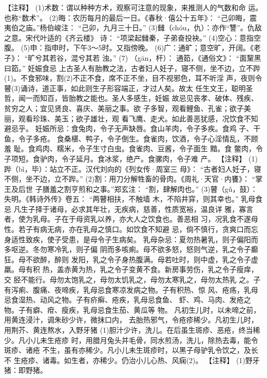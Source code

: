 \documentclass[12pt,UTF8]{ctexbook}
\begin{document}
【注释】
(1)术数：谓以种种方术，观察可注意的现象，来推测人的气数和命
运。也称“数术”。
(2)晦：农历每月的最后一日。《春秋·僖公十五年》：
“己卯晦，震
夷伯之庙。”杨伯峻注：
“己卯，九月三十日。”
(3)雠（chóu，仇）：亦作“讐”。仇敌之意。宋代叶适的《齐云楼》
诗：
“项梁起雠秦，子弟奋投袂。”
(4)空心：意指空腹。
(5)申：指申时，下午3～5时。又指傍晚。
(6)广：通旷；意空旷，开阔。《老子》：
“旷兮其若谷，混兮其若
浊。”
(7) （gān，杆）： 通筎，《通俗文》：
“面黧黑曰筎。”
妊娠食忌
上古圣人有胎教之法，古者妇人妊子，寝不侧，坐不边，立不跸
(1)。不食邪味，割(2)不正不食，席不正不坐，目不视邪色，耳不听淫
声，夜则令瞽(3)诵诗，道正事，如此则生子形容端正，才过人矣。故太
任生文王，聪明圣哲，闻一而知百，皆胎教之能也。圣人多感生，妊娠
故忌见丧孝、破体、残疾、贫穷之人；宜见贤良、喜庆、美丽之事。欲
子多智，观看鲤鱼、孔雀；欲子美丽，观看珍珠、美玉；欲子雄壮，观
看飞鹰、走犬。如此善恶犹感，况饮食不知避忌乎。
妊娠所忌：食兔肉，令子无声缺唇。食山羊肉，令子多疾。食鸡
子、干鱼，令子多疮。
食桑椹、鸭子，令子倒生。食雀肉，饮酒，令子心淫情乱，不顾羞
耻。食鸡肉、糯米，令子生寸白虫。食雀肉、豆酱，令子面生 黯。食
鳖肉，令子项短。食驴肉，令子延月。食冰浆，绝产。食骡肉，令子难
产。
【注释】
(1)跸（bì，毕）：站立不正。汉代刘向的《列女传·周室三
母》：
“古者妇人妊子，寝不侧，坐不边，立不跸。”
(2)割：用刀分解牲畜的骨肉。《周礼·天官·内饔》：
“掌王及后世
子膳羞之割亨煎和之事。”郑玄注：
“割，肆解肉也。”
(3)瞽（gǔ，鼓）：失明。《韩诗外传》卷五：
“两瞽相扶，不触墙
木，不陷井穽，则其幸也。”
乳母食忌
凡生子择于诸母，必求其年壮，无疾病，慈善，性质宽裕，温良详
雅，寡言者，使为乳母。子在于母资乳以养，亦大人之饮食也。善恶相
习，况乳食不遂母性。若子有病无病，亦在乳母之慎口。如饮食不知避
忌，倘不慎行，贪爽口而忘身适性致疾，使子受患，是母令子生病矣。
乳母杂忌：夏勿热暑乳，则子偏阳而多呕逆。冬勿寒冷乳，则子偏
阴而多咳痢。母不欲多怒，怒则气逆，乳之令子癫狂。母不欲醉，醉则
发阳，乳之令子身热腹满。母若吐时，则中虚，乳之令子虚羸。母有积
热，盖赤黄为热，乳之令子变黄不食。新房事劳伤，乳之令子瘦痒，交
胫不能行。母勿太饱乳之，母勿太饥乳之，母勿太寒乳之，母勿太热乳
之。子有泻痢、腹痛、夜啼疾，乳母忌食寒凉发病之物。子有积热、惊
风、疮疡，乳母忌食湿热、动风之物。子有疥癣、疮疾，乳母忌食鱼、
虾、鸡、马肉、发疮之物。子有癖、疳、瘦疾，乳母忌食生茄、黄瓜等
物。
凡初生儿时，以未啼之前，用黄连浸汁，调朱砂少许，微抹口内，
去胎热邪气，令疮疹稀少。凡初生儿时，用荆芥、黄连熬水，入野牙猪
(1)胆汁少许，洗儿。在后虽生斑疹、恶疮，终当稀少。凡小儿未生疮疹
时，用腊月兔头并毛骨，同水煎汤，洗儿，除热去毒，能令斑疹、诸疮
不生，虽有亦稀少。凡小儿未生斑疹时，以黑子母驴乳令饮之，及长不
生疮疹、诸毒。如生者，亦稀少。仍治小儿心热、风痫(2)。
【注释】
(1)野牙猪：即野猪。
\end{document}
